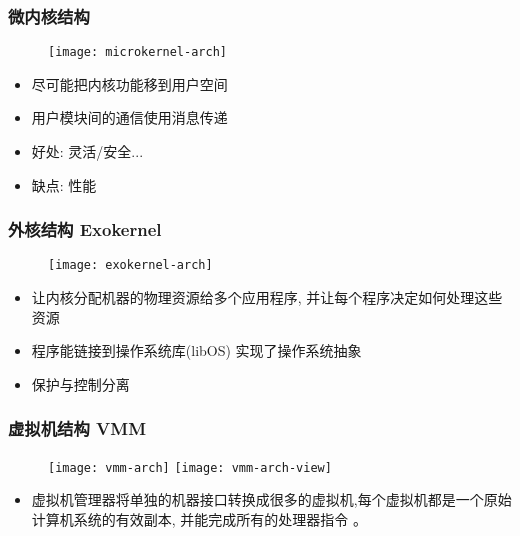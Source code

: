 \begin{frame}[plain]
	
	\frametitle{微内核结构}
	
	\begin{figure}
		\centering
		\texttt{[image: microkernel-arch]}
	\end{figure}
	\pause
	
	\begin{itemize}
		\item 尽可能把内核功能移到用户空间
		\item 用户模块间的通信使用消息传递 \pause
		\item 好处: 灵活/安全...
		\item 缺点: 性能
	\end{itemize}

\end{frame}

\begin{frame}
	
	\frametitle{外核结构 Exokernel}
	
	\begin{figure}
		\centering
		\texttt{[image: exokernel-arch]}
	\end{figure}
	\pause

	\begin{itemize}
		\item 让内核分配机器的物理资源给多个应用程序, 并让每个程序决定如何处理这些资源
		\item 程序能链接到操作系统库(libOS) 实现了操作系统抽象
		\item 保护与控制分离
	\end{itemize}
	
\end{frame}

\begin{frame}
	
	\frametitle{虚拟机结构 VMM}
	
	\begin{figure}
		\centering
		\texttt{[image: vmm-arch]} \pause
		\texttt{[image: vmm-arch-view]}
	\end{figure}
	\pause

	\begin{itemize}
		\item 虚拟机管理器将单独的机器接口转换成很多的虚拟机,每个虚拟机都是一个原始计算机系统的有效副本, 并能完成所有的处理器指令 。
	\end{itemize}
	
\end{frame}


